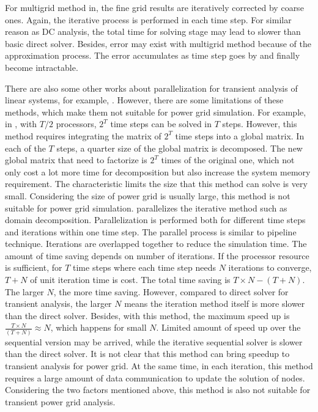 For multigrid method in\cite{Zhuofeng,Kozhaya}, the fine grid results are iteratively corrected by coarse ones. Again, the iterative process is performed in each time step. For similar reason as DC analysis, the total time for solving stage may lead to slower than basic direct solver. Besides, error may exist with multigrid method because of the approximation process. The error accumulates as time step goes by and finally become intractable. 

There are also some other works about parallelization for transient analysis of linear systems, for example, \cite{Alvarado, Scala, 
Chai}. However, there are some limitations of these methods, which make them not suitable for power grid simulation. For example, in 
\cite{Alvarado}, with $T/2$ processors, $2^T$ time steps can be solved in $T$ steps. However, this method requires integrating 
the matrix of $2^T$ time steps into a global matrix. In each of the $T$ steps, a quarter size of the global matrix is decomposed. The new global matrix that need to factorize is $2^T$ times of the original one, which not only cost a lot more time for decomposition but also increase the system memory requirement. The characteristic limits the size that this
method can solve is very small. Considering the size of power grid is usually large, this method is not suitable for power grid simulation. \cite{Chai} parallelizes the iterative method such as domain decomposition. Parallelization is performed both for different time steps and iterations within one time step. The parallel process is similar
to pipeline technique. Iterations are overlapped together to reduce the simulation time. The amount of time saving depends on number of iterations. If the processor resource is sufficient, for $T$ time steps where each time step needs $N$ iterations to converge, $T+N$ of unit iteration time is cost. The total time saving is $T\times N - (T+N)$. The larger $N$, the more time saving. However, compared to direct
solver for transient analysis, the larger $N$ means the iteration method itself is more slower than the direct solver. Besides, with this method, the maximum speed up is $\frac{T\times N}{(T+N)} \approx N$, which happens for small $N$. Limited amount of speed up over the sequential version may be arrived, while the iterative sequential solver is slower than the direct solver. It is not clear that this method can bring speedup to transient analysis for power grid. 
At the same time, in each iteration, this method requires a large amount of data communication to update the solution of nodes. Considering the two factors mentioned above, this method is also not suitable for transient power grid analysis. 

